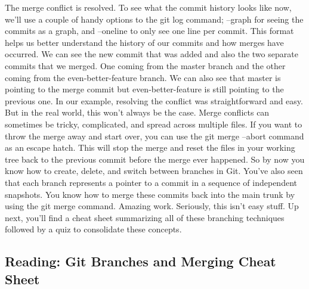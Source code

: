 	The merge conflict is resolved. To see what the commit history looks like now, we'll use a couple of handy options to the git log command; --graph for seeing the commits as a graph, and --oneline to only see one line per commit. This format helps us better understand the history of our commits and how merges have occurred. We can see the new commit that was added and also the two separate commits that we merged. One coming from the master branch and the other coming from the even-better-feature branch. We can also see that master is pointing to the merge commit but even-better-feature is still pointing to the previous one. In our example, resolving the conflict was straightforward and easy. But in the real world, this won't always be the case. Merge conflicts can sometimes be tricky, complicated, and spread across multiple files. If you want to throw the merge away and start over, you can use the git merge --abort command as an escape hatch. This will stop the merge and reset the files in your working tree back to the previous commit before the merge ever happened. So by now you know how to create, delete, and switch between branches in Git. You've also seen that each branch represents a pointer to a commit in a sequence of independent snapshots. You know how to merge these commits back into the main trunk by using the git merge command. Amazing work. Seriously, this isn't easy stuff. Up next, you'll find a cheat sheet summarizing all of these branching techniques followed by a quiz to consolidate these concepts.
	
	\subsection{Reading: Git Branches and Merging Cheat Sheet}

